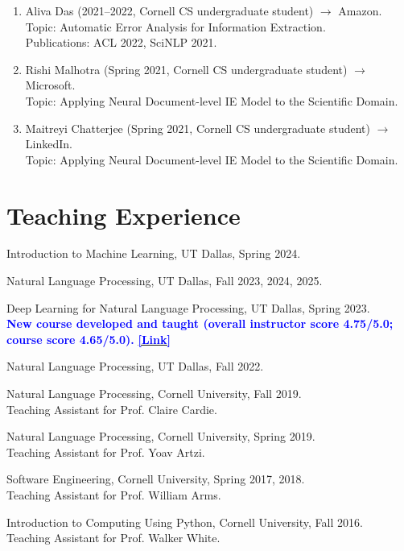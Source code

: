 \begin{enumerate}[label={},leftmargin=15pt]
\vspace{0.3mm}
\item Aliva Das (2021--2022, Cornell CS undergraduate student) $\rightarrow$ Amazon. \\
Topic: Automatic Error Analysis for Information Extraction. \\
Publications: ACL 2022, SciNLP 2021.

\vspace{0.3mm}
\item Rishi Malhotra (Spring 2021, Cornell CS undergraduate student) $\rightarrow$ Microsoft. \\
Topic: Applying Neural Document-level IE Model to the Scientific Domain.

\vspace{0.3mm}
\item Maitreyi Chatterjee (Spring 2021, Cornell CS undergraduate student) $\rightarrow$ LinkedIn. \\
Topic: Applying Neural Document-level IE Model to the Scientific Domain.  \\

\end{enumerate}


\section{Teaching Experience}

\noindent Introduction to Machine Learning, UT Dallas, Spring 2024.

\noindent Natural Language Processing, UT Dallas, Fall 2023, 2024, 2025.

\noindent Deep Learning for Natural Language Processing, UT Dallas, Spring 2023. \\
\textbf{\textcolor{blue}{New course developed and taught (overall instructor score 4.75/5.0; course score 4.65/5.0).}}
{\bf \href{https://xinyadu.github.io/cs6301/index.html}{\textcolor{blue}{[Link]}}}

\noindent Natural Language Processing, UT Dallas, Fall 2022.

\noindent Natural Language Processing, Cornell University, Fall 2019. \\
\indent Teaching Assistant for Prof. Claire Cardie.

\noindent Natural Language Processing, Cornell University, Spring 2019. \\
\indent Teaching Assistant for Prof. Yoav Artzi.

\noindent Software Engineering, Cornell University, Spring 2017, 2018. \\
\indent Teaching Assistant for Prof. William Arms.

\noindent Introduction to Computing Using Python, Cornell University, Fall 2016. \\
\indent Teaching Assistant for Prof. Walker White.
